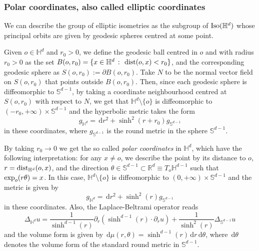 \documentclass[12pt,longbibliography]{article}
\def\d{\,\mathrm{d}}
\def\d{\,\mathrm{d}}
\def\H{\mathbb{H}}
\theoremstyle{definition}
\theoremstyle{remark}
\theoremstyle{example}
\begin{document}
\subsubsection{Polar coordinates, also called elliptic coordinates}\label{sect:polar_coordinates}

We can describe the group of elliptic isometries as the subgroup of $\textup{Iso} (\mathbb{H}^d)$ whose principal orbits are given by geodesic spheres centred at some point.

Given $o \in \mathbb{H}^d$ and $r_0 >0$, we define the geodesic ball centred in $o$ and with radius $r_0>0$ as the set $B(o, r_0 )= \{x \in \mathbb{H}^d ~\colon~ \textup{dist}(o,x)< r_0\}$, and the corresponding geodesic sphere as $S(o, r_0 ):= \partial B(o, r_0 )$. Take $N$ to be the normal vector field on $S(o, r_0 )$ that points outside $B(o, r_0 )$. Then,  since each geodesic sphere is diffeomorphic to $\mathbb{S}^{d-1}$, by taking a coordinate neighbourhood centred at $S(o, r_0 )$ with respect to $N$, we get that $\mathbb{H}^d \setminus \{o\}$ is diffeomorphic to $(-r_0, +\infty) \times \mathbb{S}^{d-1}$ and the hyperbolic metric takes the form
\[
g_{\mathbb{H}^d}= \d r^2 + \sinh^2(r+r_0)g_{\mathbb{S}^{d-1}}
\]
in these coordinates, where $g_{\mathbb{S}^{d-1}}$ is the round metric in the sphere $\mathbb{S}^{d-1}$. 

By taking $r_0 \to 0$ we get the so called \textit{polar coordinates} in $\mathbb{H}^d$, which have the following interpretation: for any $x \neq o$, we describe the point by its distance to $o$, $r= \textup{dist}_{\mathbb{H}^d} (o,x)$, and the direction $\theta \in \mathbb{S}^{d-1} \subset \mathbb{R}^d \equiv T_o \mathbb{H}^{d-1}$ such that $\textup{exp}_o (r \theta) =x$. In this case, $\mathbb{H}^d \setminus \{ o \}$ is diffeomorphic to $(0,+\infty) \times \mathbb{S}^{d-1}$ and the metric is given by
\[
g_{\mathbb{H}^d}= \d r^2 + \sinh^2(r)g_{\mathbb{S}^{d-1}}
\]
in these coordinates. Also, the Laplace-Beltrami operator reads
\begin{equation}\label{eq:laplace_beltrami_polar_coordinates}
	\Delta_{\H^d} u = \frac{1}{\sinh^{d-1}(r)}\partial_r\left(\sinh^{d-1}(r)\cdot \partial_r u\right) + \frac{1}{\sinh^2(r)}\Delta_{\mathbb{S}^{d-1}}u
\end{equation}
and the volume form is given by $\d\mu(r,\theta)=\sinh^{d-1}(r)\d r \d \theta$, where $\d \theta$ denotes the volume form of the standard round metric in $\mathbb{S}^{d-1}$. 
\end{document}
